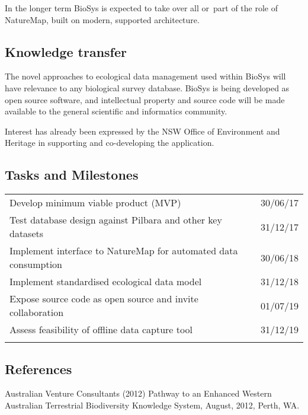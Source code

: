 \documentclass[version=last,
    paper=a4,                               %
    10pt,                                   %
    dvipsnames,
    oneside,                              %
    headings=openany,                       %
    open=any,
    BCOR=7mm,                               %
    DIV=15,     %
]{scrbook}
\begin{document}
In the longer term BioSys is expected to take over all or~part of the
role of NatureMap, built on modern, supported architecture.




\subsection*{Knowledge transfer}

The novel approaches to ecological data management used within BioSys
will have relevance to any biological survey database. BioSys is being
developed as open source software, and intellectual property and source
code will be made available to the general scientific and informatics
community.

Interest has already been expressed by the NSW Office of Environment and
Heritage in supporting and co-developing the application.




\subsection*{Tasks and Milestones}

\begin{longtable}[c]{@{}ll@{}}
\toprule\addlinespace
Develop minimum viable product (MVP) & 30/06/17
\\\addlinespace
Test database design against Pilbara and other key datasets & 31/12/17
\\\addlinespace
Implement interface to NatureMap for automated data consumption &
30/06/18
\\\addlinespace
Implement standardised ecological data model & 31/12/18
\\\addlinespace
Expose source code as open source and invite collaboration~ & 01/07/19
\\\addlinespace
Assess feasibility of offline data capture tool & 31/12/19
\\\addlinespace
\bottomrule
\end{longtable}




\subsection*{References}

Australian Venture Consultants (2012) Pathway to an Enhanced Western
Australian Terrestrial Biodiversity Knowledge System, August, 2012,
Perth, WA.
\end{document}
